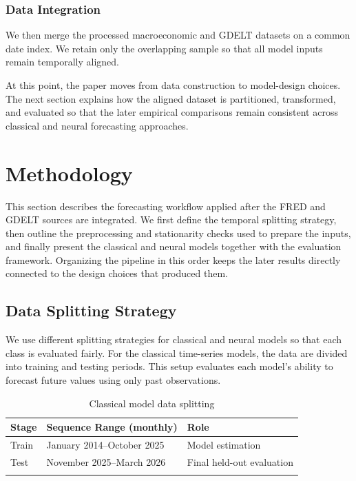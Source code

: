\documentclass[pdflatex,sn-mathphys-num]{sn-jnl}%
\theoremstyle{thmstyleone}%
\theoremstyle{thmstyletwo}%
\theoremstyle{thmstylethree}%
\begin{document}
\subsubsection{Data Integration}\label{subsubsec:dataintegration}

We then merge the processed macroeconomic and GDELT datasets on a common date index. We retain only the overlapping sample so that all model inputs remain temporally aligned.

At this point, the paper moves from data construction to model-design choices. The next section explains how the aligned dataset is partitioned, transformed, and evaluated so that the later empirical comparisons remain consistent across classical and neural forecasting approaches.

\section{Methodology}\label{secmethod}

This section describes the forecasting workflow applied after the FRED and GDELT sources are integrated. We first define the temporal splitting strategy, then outline the preprocessing and stationarity checks used to prepare the inputs, and finally present the classical and neural models together with the evaluation framework. Organizing the pipeline in this order keeps the later results directly connected to the design choices that produced them.

\subsection{Data Splitting Strategy}\label{subsec:datasplitting}

We use different splitting strategies for classical and neural models so that each class is evaluated fairly. For the classical time-series models, the data are divided into training and testing periods. This setup evaluates each model's ability to forecast future values using only past observations.

\begin{table}[h]
\centering
\caption{Classical model data splitting}
\label{tab:classical_data_split}
\begin{tabular}{@{}lll@{}}
\toprule
Stage & Sequence Range (monthly) & Role \\
\midrule
Train & January 2014--October 2025 & Model estimation \\
Test & November 2025--March 2026 & Final held-out evaluation \\
\botrule
\end{tabular}
\end{table}
\end{document}

